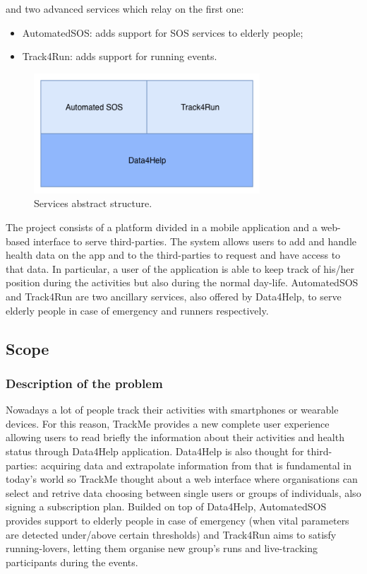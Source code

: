 \documentclass{article}
\begin{document}
and two advanced services which relay on the first one: 

\begin{itemize}
\item AutomatedSOS: adds support for SOS services to elderly people;
\item Track4Run: adds support for running events.
\end{itemize}

\begin{figure}[h!]
  \centering
  \includegraphics[height=4.5cm,keepaspectratio]{Figures/Services.png}
  \caption{Services abstract structure.}
\end{figure}

The project consists of a platform divided in a mobile application and 
a web-based interface to serve third-parties.
The system allows users to add and handle health data on the app
and to the third-parties to request and have access to that data.
In particular, a user of the application is able to keep track of 
his/her position during the activities but also during the normal 
day-life. 
AutomatedSOS and Track4Run are two ancillary services, also offered by
Data4Help, to serve elderly people in case of emergency and runners 
respectively.

\newpage
\subsection{Scope}
\subsubsection{Description of the problem}

Nowadays a lot of people track their activities with smartphones or
wearable devices. For this reason, TrackMe provides a new
complete user experience allowing users to read briefly the 
information about their activities and health status through Data4Help 
application. \newline
Data4Help is also thought for third-parties: acquiring data and 
extrapolate information from that is fundamental in today's world so 
TrackMe thought about a web interface where organisations can select 
and retrive data choosing between single users or groups of 
individuals, also signing a subscription plan. \newline
Builded on top of Data4Help, AutomatedSOS provides support to elderly 
people in case of emergency (when vital parameters are detected 
under/above certain thresholds) and Track4Run aims to satisfy 
running-lovers, letting them organise new group's runs and 
live-tracking participants during the events.
\end{document}
